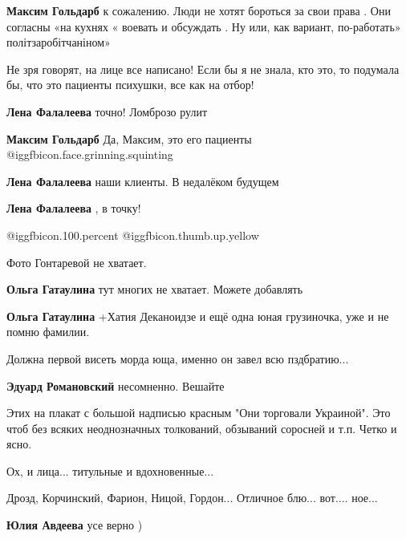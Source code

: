\begin{itemize}
\begin{itemize}
\textbf{Максим Гольдарб} к сожалению. Люди не хотят бороться за свои права . Они согласны «на кухнях « воевать и обсуждать . Ну или, как вариант, по-работать» політзаробітчаніном»
\end{itemize} %


Не зря говорят, на лице все написано! Если бы я не знала, кто это, то подумала
бы, что это пациенты психушки, все как на отбор!

\begin{itemize} %
\textbf{Лена Фалалеева} точно! Ломброзо рулит

\textbf{Максим Гольдарб} Да, Максим, это его пациенты  @igg{fbicon.face.grinning.squinting} 

\textbf{Лена Фалалеева} наши клиенты. В недалёком будущем

\textbf{Лена Фалалеева} , в точку!
\end{itemize} %

 @igg{fbicon.100.percent}  @igg{fbicon.thumb.up.yellow} 

Фото Гонтаревой не хватает.

\begin{itemize} %
\textbf{Ольга Гатаулина} тут многих не хватает. Можете добавлять

\textbf{Ольга Гатаулина} +Хатия Деканоидзе и ещё одна юная грузиночка, уже и не помню фамилии.
\end{itemize} %

Должна первой висеть морда юща, именно он завел всю пздбратию...

\begin{itemize} %
\textbf{Эдуард Романовский} несомненно. Вешайте
\end{itemize} %

Этих на плакат с большой надписью красным "Они торговали Украиной". Это чтоб без всяких неоднозначных толкований, обзываний соросней и т.п. Четко и ясно.

Ох, и лица... титульные и вдохновенные...

Дрозд, Корчинский, Фарион, Ницой, Гордон... Отличное блю... вот.... ное...

\begin{itemize} %
\textbf{Юлия Авдеева} усе верно )
\end{itemize} %


\end{itemize}
